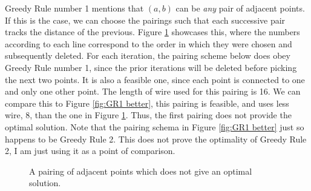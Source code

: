 \begin{solution}

    Greedy Rule number 1 mentions that $(a, b)$ can be \textit{any} pair of adjacent points. If this is the case, we can choose the pairings such that each successive pair tracks the distance of the previous. Figure \ref{fig:GR1 fail} showcases this, where the numbers according to each line correspond to the order in which they were chosen and subsequently deleted. For each iteration, the pairing scheme below does obey Greedy Rule number 1, since the prior iterations will be deleted before picking the next two points. It is also a feasible one, since each point is connected to one and only one other point. The length of wire used for this pairing is 16. We can compare this to Figure \ref{fig:GR1 better}, this pairing is feasible, and uses less wire, 8, than the one in Figure \ref{fig:GR1 fail}. Thus, the first pairing does not provide the optimal solution. Note that the pairing schema in Figure \ref{fig:GR1 better} just so happens to be Greedy Rule 2. This does not prove the optimality of Greedy Rule 2, I am just using it as a point of comparison.\par
    
    \vspace{10mm}
    \renewcommand{\d}{1.5}
    \begin{figure}[!h]
        \centering
        \caption{A pairing of adjacent points which does not give an optimal solution.}
        \label{fig:GR1 fail}
    \end{figure}


\end{solution}
